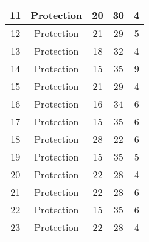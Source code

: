 \documentclass[results.tex]{subfiles}
\begin{document}
\begin{center}
\begin{tabular}{| c || c | c | c | c |}
            \hline
            11                      & Protection                   & 20                     & 30                      & 4                    \\
            \hline
            12                      & Protection                   & 21                     & 29                      & 5                    \\
            \hline
            13                      & Protection                   & 18                     & 32                      & 4                    \\
            \hline
            14                      & Protection                   & 15                     & 35                      & 9                    \\
            \hline
            15                      & Protection                   & 21                     & 29                      & 4                    \\
            \hline
            16                      & Protection                   & 16                     & 34                      & 6                    \\
            \hline
            17                      & Protection                   & 15                     & 35                      & 6                    \\
            \hline
            18                      & Protection                   & 28                     & 22                      & 6                    \\
            \hline
            19                      & Protection                   & 15                     & 35                      & 5                    \\
            \hline
            20                      & Protection                   & 22                     & 28                      & 4                    \\
            \hline
            21                      & Protection                   & 22                     & 28                      & 6                    \\
            \hline
            22                      & Protection                   & 15                     & 35                      & 6                    \\
            \hline
            23                      & Protection                   & 22                     & 28                      & 4                    \\

\end{tabular}
\end{center}
\end{document}
